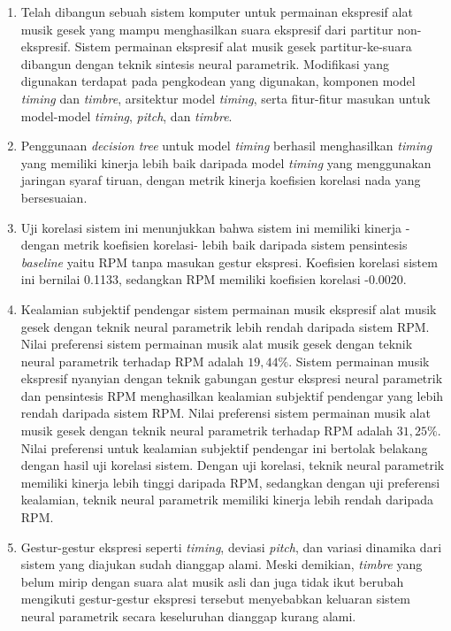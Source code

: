 \begin{enumerate}

\item Telah dibangun sebuah sistem komputer untuk permainan ekspresif alat musik gesek yang mampu menghasilkan suara ekspresif dari partitur non-ekspresif. Sistem permainan ekspresif alat musik gesek partitur-ke-suara dibangun dengan teknik sintesis neural parametrik. Modifikasi yang digunakan terdapat pada pengkodean yang digunakan, komponen model \textit{timing} dan \textit{timbre}, arsitektur model \textit{timing}, serta fitur-fitur masukan untuk model-model \textit{timing}, \textit{pitch}, dan \textit{timbre}.

\item Penggunaan \textit{decision tree} untuk model \textit{timing} berhasil menghasilkan \textit{timing} yang memiliki kinerja lebih baik daripada model \textit{timing} yang menggunakan jaringan syaraf tiruan, dengan metrik kinerja koefisien korelasi nada yang bersesuaian.

\item Uji korelasi sistem ini menunjukkan bahwa sistem ini memiliki kinerja -dengan metrik koefisien korelasi- lebih baik daripada sistem pensintesis \textit{baseline} yaitu RPM tanpa masukan gestur ekspresi. Koefisien korelasi sistem ini bernilai 0.1133, sedangkan RPM memiliki koefisien korelasi -0.0020.

\item Kealamian subjektif pendengar sistem permainan musik ekspresif alat musik gesek dengan teknik neural parametrik lebih rendah daripada sistem RPM. Nilai preferensi sistem permainan musik alat musik gesek dengan teknik neural parametrik terhadap RPM adalah $19,44\%$. %
Sistem permainan musik ekspresif nyanyian dengan teknik gabungan gestur ekspresi neural parametrik dan pensintesis RPM menghasilkan kealamian subjektif pendengar yang lebih rendah daripada sistem RPM. Nilai preferensi sistem permainan musik alat musik gesek dengan teknik neural parametrik terhadap RPM adalah $31,25\%$. %
Nilai preferensi untuk kealamian subjektif pendengar ini bertolak belakang dengan hasil uji korelasi sistem. Dengan uji korelasi, teknik neural parametrik memiliki kinerja lebih tinggi daripada RPM, sedangkan dengan uji preferensi kealamian, teknik neural parametrik memiliki kinerja lebih rendah daripada RPM.

\item Gestur-gestur ekspresi seperti \textit{timing}, deviasi \textit{pitch}, dan variasi dinamika dari sistem yang diajukan sudah dianggap alami. Meski demikian, \textit{timbre} yang belum mirip dengan suara alat musik asli dan juga tidak ikut berubah mengikuti gestur-gestur ekspresi tersebut menyebabkan keluaran sistem neural parametrik secara keseluruhan dianggap kurang alami.


\end{enumerate}
